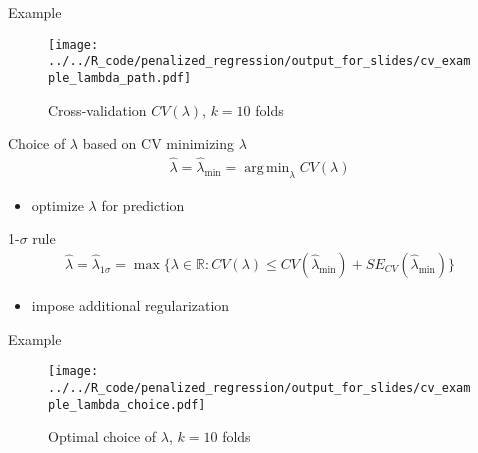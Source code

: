 \documentclass[xcolor=dvipsnames]{beamer}
\DeclareMathOperator{\argmin}{arg\,min}
\begin{document}
\begin{frame}{Example}
  \begin{figure}
  \texttt{[image: ../../R\_code/penalized\_regression/output\_for\_slides/cv\_example\_lambda\_path.pdf]}
   \caption{Cross-validation $CV(\lambda)$, $k = 10$ folds}
\end{figure}
\end{frame}

\begin{frame}{Choice of $\lambda$ based on CV}
minimizing $\lambda$
\begin{align*}
  \hat{\lambda} = \hat{\lambda}_{\min} = \argmin_{\lambda} CV(\lambda)
\end{align*}
\begin{itemize}
  \item optimize $\lambda$ for prediction
\end{itemize}
1-$\sigma$ rule
\begin{align*}
  \hat{\lambda} = \hat{\lambda}_{1\sigma} = \max \{\lambda \in \mathbb{R} : CV(\lambda) \leq CV(\hat{\lambda}_{\min}) +  SE_{CV}(\hat{\lambda}_{\min}) \}
\end{align*}
\begin{itemize}
  \item impose additional regularization
\end{itemize}
\end{frame}

\begin{frame}{Example}
  \begin{figure}
  \texttt{[image: ../../R\_code/penalized\_regression/output\_for\_slides/cv\_example\_lambda\_choice.pdf]}
   \caption{Optimal choice of $\lambda$, $k = 10$ folds}
\end{figure}
\end{frame}

\appendix
\end{document}
